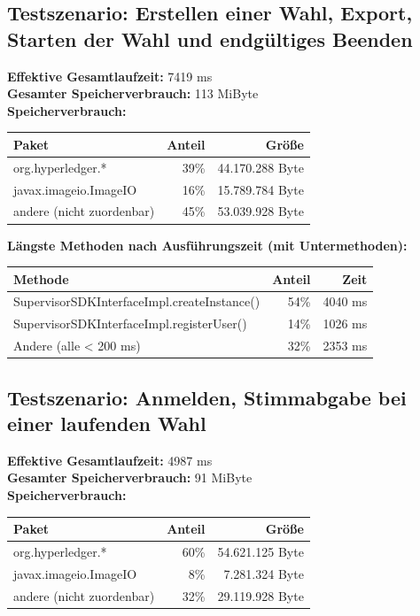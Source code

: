 \documentclass[parskip=full]{scrartcl}
\begin{document}
\subsection{Testszenario: Erstellen einer Wahl, Export, Starten der Wahl und endgültiges Beenden}
\textbf{Effektive Gesamtlaufzeit:} 7419 ms\\
\textbf{Gesamter Speicherverbrauch:} 113 MiByte \\
\textbf{Speicherverbrauch:}

\begin{table}[h!]
	\begin{tabular}[t]{l r r}
		Paket & Anteil & Größe \\ \hline
		org.hyperledger.* & 39\% & 44.170.288 Byte \\
		javax.imageio.ImageIO & 16\% & 15.789.784 Byte \\
		andere (nicht zuordenbar) & 45\% & 53.039.928 Byte \\
	\end{tabular}
\end{table}
\textbf{Längste Methoden nach Ausführungszeit (mit Untermethoden):}

\begin{table}[h!]
	\begin{tabular}[t]{lrr}
		Methode & Anteil & Zeit \\ \hline
		SupervisorSDKInterfaceImpl.createInstance() & 54\% & 4040 ms \\
		SupervisorSDKInterfaceImpl.registerUser() & 14\% & 1026 ms \\
		Andere (alle < 200 ms) & 32\% & 2353 ms
	\end{tabular}
\end{table}
\subsection{Testszenario: Anmelden, Stimmabgabe bei einer laufenden Wahl}
\textbf{Effektive Gesamtlaufzeit:} 4987 ms\\
\textbf{Gesamter Speicherverbrauch:} 91 MiByte \\
\textbf{Speicherverbrauch:}

\begin{table}[h!]
	\begin{tabular}[t]{l r r}
		Paket & Anteil & Größe \\ \hline
		org.hyperledger.* & 60\% & 54.621.125 Byte \\
		javax.imageio.ImageIO & 8\% & 7.281.324 Byte \\
		andere (nicht zuordenbar) & 32\% & 29.119.928 Byte \\
	\end{tabular}
\end{table}
\end{document}
